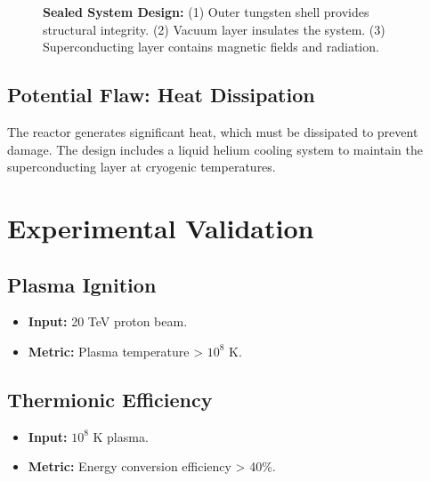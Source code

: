 \documentclass[12pt, a4paper]{article}
\begin{document}
\begin{figure}[H]
\centering
{}
\caption{
\textbf{Sealed System Design:} 
(1) Outer tungsten shell provides structural integrity. 
(2) Vacuum layer insulates the system. 
(3) Superconducting layer contains magnetic fields and radiation.
}
\label{fig:sealed_system}
\end{figure}

\subsection{Potential Flaw: Heat Dissipation}
The reactor generates significant heat, which must be dissipated to prevent damage. The design includes a liquid helium cooling system to maintain the superconducting layer at cryogenic temperatures.

\section{Experimental Validation}
\subsection{Plasma Ignition}
\begin{itemize}
\item \textbf{Input:} 20 TeV proton beam.
\item \textbf{Metric:} Plasma temperature > $10^8$ K.
\end{itemize}

\subsection{Thermionic Efficiency}
\begin{itemize}
\item \textbf{Input:} $10^8$ K plasma.
\item \textbf{Metric:} Energy conversion efficiency > 40\%.
\end{itemize}
\end{document}
